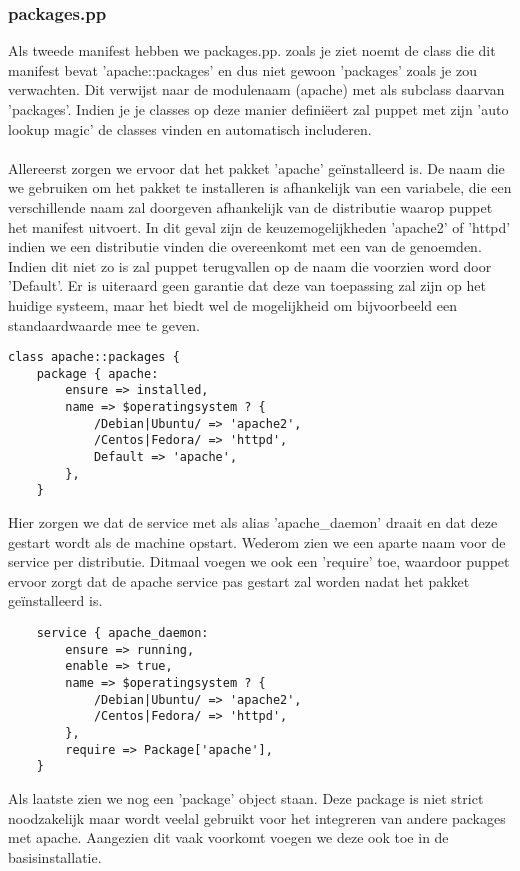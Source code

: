\subsubsection{packages.pp}
Als tweede manifest hebben we packages.pp. zoals je ziet noemt de class die dit manifest bevat 'apache::packages' en dus niet gewoon 'packages' zoals je zou verwachten. Dit verwijst naar de modulenaam (apache) met als subclass daarvan 'packages'. Indien je je classes op deze manier defini\"eert zal puppet met zijn 'auto lookup magic' de classes vinden en automatisch includeren.\\\\
Allereerst zorgen we ervoor dat het pakket 'apache' ge\"installeerd is. De naam die we gebruiken om het pakket te installeren is afhankelijk van een variabele, die een verschillende naam zal doorgeven afhankelijk van de distributie waarop puppet het manifest uitvoert. In dit geval zijn de keuzemogelijkheden 'apache2' of 'httpd' indien we een distributie vinden die overeenkomt met een van de genoemden. Indien dit niet zo is zal puppet terugvallen op de naam die voorzien word door 'Default'. Er is uiteraard geen garantie dat deze van toepassing zal zijn op het huidige systeem, maar het biedt wel de mogelijkheid om bijvoorbeeld een standaardwaarde mee te geven.
\begin{code}
\begin{lstlisting}[tabsize=4]
class apache::packages {
	package { apache:
		ensure => installed,
		name => $operatingsystem ? {
			/Debian|Ubuntu/ => 'apache2',
			/Centos|Fedora/ => 'httpd',
			Default => 'apache',
		},
	}
\end{lstlisting}
\end{code}
%
Hier zorgen we dat de service met als alias 'apache\_daemon' draait en dat deze gestart wordt als de machine opstart. Wederom zien we een aparte naam voor de service per distributie. Ditmaal voegen we ook een 'require' toe, waardoor puppet ervoor zorgt dat de apache service pas gestart zal worden nadat het pakket ge\"installeerd is.
%
\begin{code}
\begin{lstlisting}
	service { apache_daemon:
		ensure => running,
		enable => true,
		name => $operatingsystem ? {
			/Debian|Ubuntu/ => 'apache2',
			/Centos|Fedora/ => 'httpd',
		},
		require => Package['apache'],
	}
\end{lstlisting}
\end{code}
%
Als laatste zien we nog een 'package' object staan. Deze package is niet strict noodzakelijk maar wordt veelal gebruikt voor het integreren van andere packages met apache. Aangezien dit vaak voorkomt voegen we deze ook toe in de basisinstallatie.
